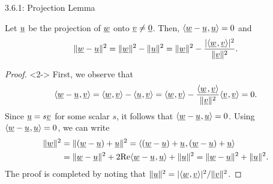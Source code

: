 \documentclass[10pt,english,aspectratio=169]{beamer}
\begin{document}
\begin{frame}{3.6.1: Projection Lemma}

\vspace{-2mm}

\begin{lemma}
Let $\underline{u}$ be the projection of $\underline{w}$ onto $\underline{v}\neq\underline{0}$.
Then, ${\langle  \underline{w}-\underline{u}  \mskip1mu ,  \underline{u}  \rangle} = 0$ and \vspace{-2mm}
\[ \|\underline{w}-\underline{u}\|^2 =  \|\underline{w}\|^2 - \| \underline{u} \|^2 = \|\underline{w}\|^2 - \frac{|{\langle  \underline{w}  \mskip1mu ,  \underline{v}  \rangle}|^2}{\|\underline{v}\|^2}. \]
\end{lemma}

\vspace{-1mm}

\begin{proof}<2->
First, we observe that \vspace{-3mm}
\[ \tinner{ \vecnot{w} - \vecnot{u} }{ \vecnot{v} } = \tinner{ \vecnot{w} }{ \vecnot{v} } - \tinner{ \vecnot{u} }{ \vecnot{v} } = \tinner{ \vecnot{w} }{ \vecnot{v} } - \frac{\inner{ \vecnot{w} }{ \vecnot{v} }}{\|\vecnot{v}\|^2} \tinner{ \vecnot{v} }{ \vecnot{v} } = 0. \vspace{-1.5mm} \]
Since $\underline{u} = s \underline{v}$ for some scalar $s$, it follows that ${\langle  \underline{w}-\underline{u}  \mskip1mu ,  \underline{u}  \rangle} =  0$.
Using ${\langle  \underline{w}-\underline{u}  \mskip1mu ,  \underline{u}  \rangle} = 0$, we can write \vspace{-2mm}
\begin{align*}
\|\vecnot{w}\|^2 &= \|(\vecnot{w}-\vecnot{u})+\vecnot{u}\|^2
= \tinner{ (\vecnot{w}-\vecnot{u})+\vecnot{u}}{(\vecnot{w}-\vecnot{u})+\vecnot{u}} \\
&= \|\vecnot{w}-\vecnot{u}\|^2 + 2 \Real \tinner{ \vecnot{w}-\vecnot{u} }{ \vecnot{u} } + \|\vecnot{u}\|^2
= \|\vecnot{w}-\vecnot{u}\|^2 + \|\vecnot{u}\|^2. \vspace{-1mm}
\end{align*}
The proof is completed by noting that $\|\underline{u}\|^2 = |{\langle  \underline{w}  \mskip1mu ,  \underline{v}  \rangle}|^2 / \|\underline{v}\|^2$.
\end{proof}

\end{frame}
\end{document}
